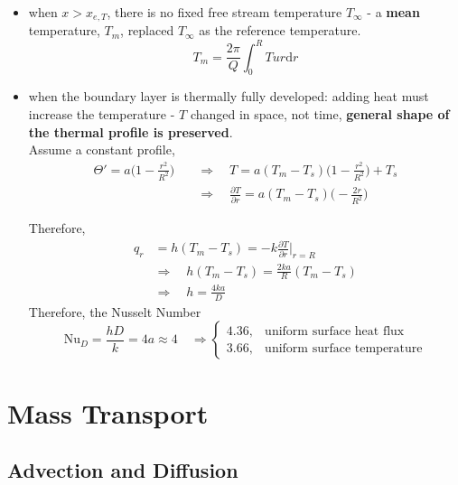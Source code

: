 \documentclass[12pt, a4paper]{article}
\numberwithin{equation}{subsection}
\begin{document}
\begin{itemize}
    \item when $x>x_{e,T}$, there is no fixed free stream temperature $T_\infty$ - a \textbf{mean} temperature, $T_m$, replaced $T_\infty$ as the reference temperature.
    \[
        T_m = \frac{2\pi}{Q} \int_{0}^{R} T u r \mathrm{d}r
    \]

    \item when the boundary layer is thermally fully developed: adding heat must increase the temperature - $T$ changed in space, not time, \textbf{general shape of the thermal profile is preserved}. \\ 
    
    Assume a constant profile,
    \begin{align*}
        \Theta' = a \bigg( 1 - \frac{r^2}{R^2} \bigg) \quad 
        & \Rightarrow \quad T = a (T_m - T_s) \bigg( 1 - \frac{r^2}{R^2} \bigg) + T_s \\
        & \Rightarrow \quad \frac{\partial T}{\partial r} = a (T_m - T_s) \bigg(- \frac{2r}{R^2} \bigg)
    \end{align*}
    
    Therefore,
    \begin{align*}
        q_r & =  h(T_m - T_s) = -k \frac{\partial T}{\partial r} \bigg\rvert_{r=R}\\
        & \Rightarrow \quad h(T_m - T_s) = \frac{2ka}{R} (T_m - T_s) \\
        & \Rightarrow \quad h = \frac{4ka}{D}
    \end{align*}
    Therefore, the Nusselt Number
    \[
        \mathrm{Nu}_D = \frac{hD}{k} = 4a \approx 4 \quad \Rightarrow 
        \begin{cases}
            4.36, & \text{uniform surface heat flux}\\
            3.66, & \text{uniform surface temperature}
        \end{cases}
    \]
\end{itemize}

\newpage
\section{Mass Transport}
\subsection{Advection and Diffusion}
\end{document}
